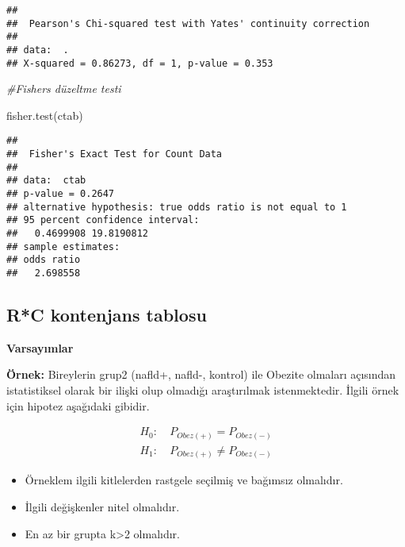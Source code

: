 \documentclass[
]{article}
\newenvironment{Shaded}{\begin{snugshade}}{\end{snugshade}}
\newcommand{\CommentTok}[1]{\textcolor[rgb]{0.56,0.35,0.01}{\textit{#1}}}
\newcommand{\FunctionTok}[1]{\textcolor[rgb]{0.00,0.00,0.00}{#1}}
\newcommand{\NormalTok}[1]{#1}
\newcommand{\OtherTok}[1]{\textcolor[rgb]{0.56,0.35,0.01}{#1}}
\newcommand{\SpecialCharTok}[1]{\textcolor[rgb]{0.00,0.00,0.00}{#1}}
\providecommand{\tightlist}{%
  \setlength{\itemsep}{0pt}\setlength{\parskip}{0pt}}
\begin{document}
\begin{verbatim}
## 
##  Pearson's Chi-squared test with Yates' continuity correction
## 
## data:  .
## X-squared = 0.86273, df = 1, p-value = 0.353
\end{verbatim}

\begin{Shaded}
\begin{Highlighting}[]
\CommentTok{\#Fisher\textquotesingle{}s düzeltme testi}

\FunctionTok{fisher.test}\NormalTok{(ctab)}
\end{Highlighting}
\end{Shaded}

\begin{verbatim}
## 
##  Fisher's Exact Test for Count Data
## 
## data:  ctab
## p-value = 0.2647
## alternative hypothesis: true odds ratio is not equal to 1
## 95 percent confidence interval:
##   0.4699908 19.8190812
## sample estimates:
## odds ratio 
##   2.698558
\end{verbatim}

\hypertarget{rc-kontenjans-tablosu}{%
\subsection{R*C kontenjans tablosu}\label{rc-kontenjans-tablosu}}

\textbf{Varsayımlar}

\textbf{Örnek:} Bireylerin grup2 (nafld+, nafld-, kontrol) ile Obezite
olmaları açısından istatistiksel olarak bir ilişki olup olmadığı
araştırılmak istenmektedir. İlgili örnek için hipotez aşağıdaki gibidir.

\begin{align*}
  H_0:&~ P_{Obez(+)} = P_{Obez(-)}  \\
  H_1:&~ P_{Obez(+)} \neq P_{Obez(-)}
\end{align*}

\begin{itemize}
\tightlist
\item
  Örneklem ilgili kitlelerden rastgele seçilmiş ve bağımsız olmalıdır.
\item
  İlgili değişkenler nitel olmalıdır.
\item
  En az bir grupta k\textgreater2 olmalıdır.
\end{itemize}

\begin{Shaded}
\end{Shaded}
\end{document}
